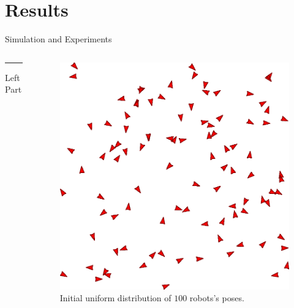 \documentclass[10pt]{beamer}
\begin{document}
\section{Results}
\begin{frame}{Simulation and Experiments}{}
  \begin{block}{}
     \begin{columns}[T] %
      \begin{column}{.48\textwidth}
        \color{red}\rule{\linewidth}{4pt}
        Left Part
      \end{column}
      \begin{column}{.48\textwidth}
        \begin{figure}
          \includegraphics[scale=0.45]{figs/initial-formation}
          \caption{Initial uniform distribution of $100$ robots's
            poses.}
        \end{figure}
      \end{column}%
    \end{columns}
  \end{block}
\end{frame}
\end{document}
